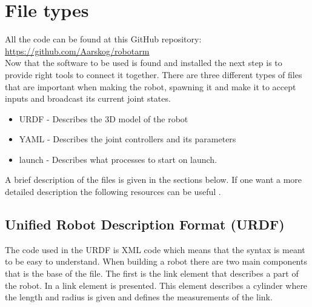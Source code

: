 




\section{File types}
All the code can be found at this GitHub repository: \href{https://github.com/Aarskog/robotarm}{\underline{https://github.com/Aarskog/robotarm}}\\

Now that the software to be used is found and installed the next step is to provide right tools to connect it together. There are three different types of files that are important when making the robot, spawning it and make it to accept inputs and broadcast its current joint states. 
\begin{itemize}
    \item URDF - Describes the 3D model of the robot
    \item YAML - Describes the joint controllers and its parameters
    \item launch - Describes what processes to start on launch.
\end{itemize}
A brief description of the files is given in the sections below.  If one want a more detailed description the following resources can be useful \cite{ROSWiki,GazeboURDF,XMLdoc,YAMLdoc}.

\subsection{Unified Robot Description Format (URDF)}\label{sec:basicURDF}
The code used in the URDF is XML code which means that the syntax is meant to be easy to understand\cite{XMLdoc}. When building a robot there are two main components that is the base of the file. The first is the link element that describes a part of the robot. In  a link element is presented. This element describes a cylinder where the length and radius is given and defines the measurements of the link. 



